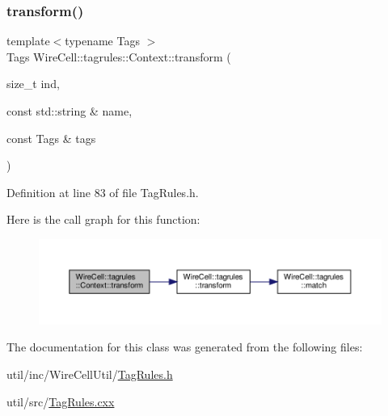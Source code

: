 \subsubsection{\texorpdfstring{transform()}{transform()}\hspace{0.1cm}{\footnotesize\ttfamily [2/2]}}
{\footnotesize\ttfamily template$<$typename Tags $>$ \\
Tags Wire\+Cell\+::tagrules\+::\+Context\+::transform (\begin{DoxyParamCaption}\item[{size\+\_\+t}]{ind,  }\item[{const std\+::string \&}]{name,  }\item[{const Tags \&}]{tags }\end{DoxyParamCaption})\hspace{0.3cm}{\ttfamily [inline]}}



Definition at line 83 of file Tag\+Rules.\+h.

Here is the call graph for this function\+:
\nopagebreak
\begin{figure}[H]
\begin{center}
\leavevmode
\includegraphics[width=350pt]{class_wire_cell_1_1tagrules_1_1_context_aeade5e7b1f30a07bb1194320575e0ec0_cgraph}
\end{center}
\end{figure}


The documentation for this class was generated from the following files\+:\begin{DoxyCompactItemize}
\item 
util/inc/\+Wire\+Cell\+Util/\hyperlink{_tag_rules_8h}{Tag\+Rules.\+h}\item 
util/src/\hyperlink{_tag_rules_8cxx}{Tag\+Rules.\+cxx}\end{DoxyCompactItemize}
